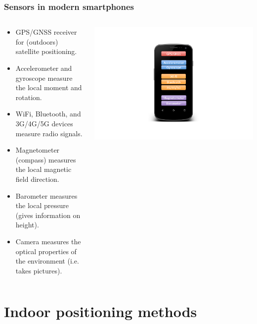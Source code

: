 \documentclass[xcolor=svgnames,english,presentation]{beamer}
\begin{document}
\begin{frame}
  \frametitle{Sensors in modern smartphones}

  \begin{columns}
  \begin{column}{0.6\textwidth}
  \begin{itemize}[<+->]       
  \item \alert{GPS/GNSS receiver} for (outdoors) satellite positioning.
  \item \alert{Accelerometer and gyroscope} measure the local moment and rotation.
  \item \alert{WiFi, Bluetooth, and 3G/4G/5G} devices measure radio signals.
  \item \alert{Magnetometer} (compass) measures the local magnetic field direction.
  \item \alert{Barometer} measures the local pressure (gives information on height).
  \item \alert{Camera} measures the optical properties of the environment (i.e. takes pictures).
  \end{itemize}
  \end{column}
  \begin{column}{0.4\textwidth}
  \includegraphics[width=\columnwidth]{smartphone}
  \end{column}
  \end{columns}
\end{frame}

\section{Indoor positioning methods}
\end{document}

